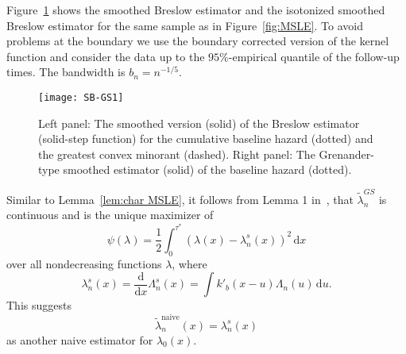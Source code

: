 \documentclass[11pt,reqno]{amsart}
\theoremstyle{definition}
\theoremstyle{plain}
\theoremstyle{remark}
\begin{document}
Figure~\ref{fig:GS} shows the smoothed Breslow estimator and the isotonized smoothed Breslow estimator for the same sample as in Figure~\ref{fig:MSLE}.
To avoid problems at the boundary we use the boundary corrected version of the kernel function and consider the data up to the $95\%$-empirical quantile of the follow-up times.
The bandwidth is $b_n=n^{-1/5}$.
\begin{figure}[t]
\texttt{[image: SB-GS1]}
\caption{Left panel:
The smoothed version (solid) of the Breslow estimator (solid-step function) for the cumulative baseline hazard (dotted)
and the greatest convex minorant (dashed).
Right panel: The Grenander-type smoothed estimator (solid) of the baseline hazard (dotted).}
\label{fig:GS}
\end{figure}
Similar to Lemma~\ref{lem:char MSLE}, it follows from Lemma 1 in~\cite{GJ10},
that $\tilde{\lambda}_n^{GS}$ is continuous and is the unique maximizer of
\[
\psi(\lambda)=\frac{1}{2}
\int_0^{\tau^*}
\left(
\lambda(x)-\lambda_n^s(x)
\right)^2\,\mathrm{d}x
\]
over all nondecreasing functions $\lambda$, where
\begin{equation}
\label{def:vn GS}
\lambda_n^s(x)=\frac{\mathrm{d}}{\mathrm{d}x}\Lambda_n^s(x)=\int k'_b(x-u)\Lambda_n(u)\,\mathrm{d}u.
\end{equation}
This suggests
\begin{equation}
\label{def:naive est GS}
\tilde{\lambda}_n^{\mathrm{naive}}(x)=\lambda_n^s(x)
\end{equation}
as another naive estimator for $\lambda_0(x)$.
\end{document}
